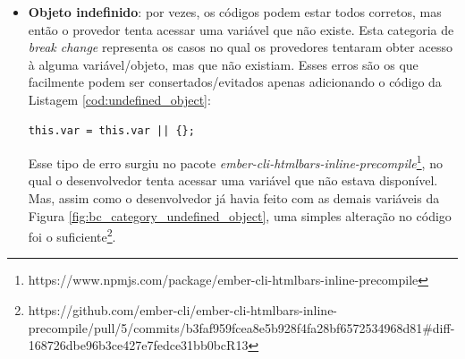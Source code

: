 \begin{itemize}
    \item \textbf{Objeto indefinido}: por vezes, os códigos podem estar todos corretos, mas então o provedor tenta acessar uma variável que não existe. Esta categoria de \textit{break change} representa os casos no qual os provedores tentaram obter acesso à alguma variável/objeto, mas que não existiam. Esses erros são os que facilmente podem ser consertados/evitados apenas adicionando o código da Listagem \ref{cod:undefined_object}:

    \begin{lstlisting}[style=bash, label=cod:undefined_object]
    this.var = this.var || {};
    \end{lstlisting}

    Esse tipo de erro surgiu no pacote \textit{ember-cli-htmlbars-inline-precompile}\footnote{https://www.npmjs.com/package/ember-cli-htmlbars-inline-precompile}, no qual o desenvolvedor tenta acessar uma variável que não estava disponível. Mas, assim como o desenvolvedor já havia feito com as demais variáveis da Figura \ref{fig:bc_category_undefined_object}, uma simples alteração no código foi o suficiente\footnote{https://github.com/ember-cli/ember-cli-htmlbars-inline-precompile/pull/5/commits/b3faf959fcea8e5b928f4fa28bf6572534968d81\#diff-168726dbe96b3ce427e7fedce31bb0bcR13}.


\end{itemize}

